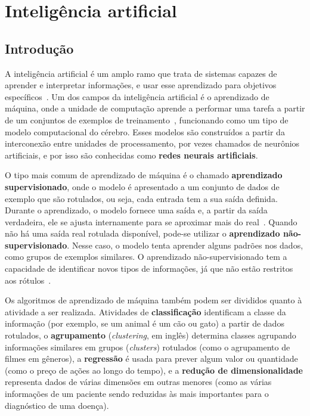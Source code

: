 \chapter{Inteligência artificial}\label{cap:ia} %
\section{Introdução}\label{sec:ia_intro}
A inteligência artificial é um amplo ramo que trata de sistemas capazes de aprender e interpretar informações, e usar esse aprendizado para objetivos específicos~\cite{haenlein_brief_2019}. Um dos campos da inteligência artificial é o aprendizado de máquina, onde a unidade de computação aprende a performar uma tarefa a partir de um conjuntos de exemplos de treinamento~\cite{louridas_machine_2016}, funcionando como um tipo de modelo computacional do cérebro. Esses modelos são construídos a partir da interconexão entre unidades de processamento, por vezes chamados de neurônios artificiais, e por isso são conhecidas como \textbf{redes neurais artificiais}.

O tipo mais comum de aprendizado de máquina é o chamado \textbf{aprendizado supervisionado}, onde o modelo é apresentado a um conjunto de dados de exemplo que são rotulados, ou seja, cada entrada tem a sua saída definida. Durante o aprendizado, o modelo fornece uma saída e, a partir da saída verdadeira, ele se ajusta internamente para se aproximar mais do real~\cite{lecun_deep_2015}. Quando não há uma saída real rotulada disponível, pode-se utilizar o \textbf{aprendizado não-supervisionado}. Nesse caso, o modelo tenta aprender alguns padrões nos dados, como grupos de exemplos similares. O aprendizado não-supervisionado tem a capacidade de identificar novos tipos de informações, já que não estão restritos aos rótulos~\cite{asnicar_machine_2023}.

Os algoritmos de aprendizado de máquina também podem ser divididos quanto à atividade a ser realizada. Atividades de \textbf{classificação} identificam a classe da informação (por exemplo, se um animal é um cão ou gato) a partir de dados rotulados, o \textbf{agrupamento} (\textit{clustering}, em inglês) determina classes agrupando informações similares em grupos (\textit{clusters}) rotulados (como o agrupamento de filmes em gêneros), a \textbf{regressão} é usada para prever algum valor ou quantidade (como o preço de ações ao longo do tempo), e a \textbf{redução de dimensionalidade} representa dados de várias dimensões em outras menores (como as várias informações de um paciente sendo reduzidas às mais importantes para o diagnóstico de uma doença).

